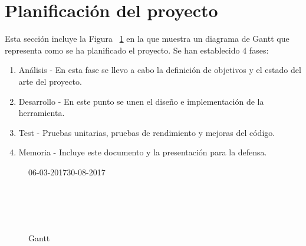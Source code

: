 \documentclass[a4paper,12pt]{article}
\begin{document}
\section{Planificación del proyecto}
Esta sección incluye la Figura ~\ref*{fig:figure4} en la que muestra un diagrama de Gantt que representa como se ha planificado el proyecto. Se han establecido 4 fases:
\begin{enumerate}
	\item Análisis - En esta fase se llevo a cabo la definición de objetivos y el estado del arte del proyecto.
	\item Desarrollo - En este punto se unen el diseño e implementación de la herramienta.
	\item Test - Pruebas unitarias, pruebas de rendimiento y mejoras del código.
	\item Memoria - Incluye este documento y la presentación para la defensa.
\end{enumerate}
\begin{figure}[H]
	\centering
	\begin{center}
		\begin{ganttchart}[
			hgrid,x unit=0.69mm,
			hgrid style/.style={draw=black!5, line width=.75pt},
			vgrid={*{6}{draw=none}},
			time slot format=little-endian]{06-03-2017}{30-08-2017}
			 \\
			 \\
			 \\
			 \\
			 \\
		\end{ganttchart}
	\end{center}
	\caption{Gantt}
	\label{fig:figure4}
\end{figure}
\end{document}
